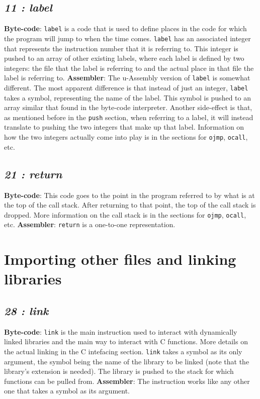 \documentclass[12pt]{report}
\begin{document}
  \subsection{\emph{11 : label}}
  \textbf{Byte-code}: \verb|label| is a code that is used to define places in the code
  for which the program will jump to when the time comes.  \verb|label| has an
  associated integer that represents the instruction number that it is referring to.
  This integer is pushed to an array of other existing labels, where each label is
  defined by two integers: the file that the label is referring to and the actual
  place in that file the label is referring to.\newline
  \textbf{Assembler}: The u-Assembly version of \verb|label| is somewhat different.
  The most apparent difference is that instead of just an integer, \verb|label| takes
  a symbol, representing the name of the label.  This symbol is pushed to an array
  similar that found in the byte-code interpreter.  Another side-effect is that,
  as mentioned before in the \verb|push| section, when referring to a label, it
  will instead translate to pushing the two integers that make up that label.
  \newline
  Information on how the two integers actually come into play is in the sections for
  \verb|ojmp|, \verb|ocall|, etc.
  \subsection{\emph{21 : return}}
  \textbf{Byte-code}: This code goes to the point in the program referred to by what
  is at the top of the call stack.  After returning to that point, the top of
  the call stack is dropped.  More information on the call stack is in the sections for
  \verb|ojmp|, \verb|ocall|, etc.\newline
  \textbf{Assembler}: \verb|return| is a one-to-one representation.

  \section{Importing other files and linking libraries}
  \subsection{\emph{28 : link}}
  \textbf{Byte-code}: \verb|link| is the main instruction used to interact with
  dynamically linked libraries and the main way to interact with C functions.  More
  details on the actual linking in the C intefacing section.  \verb|link| takes a
  symbol as its only argument, the symbol being the name of the library to be linked
  (note that the library's extension is needed).  The library is pushed to the stack
  for which functions can be pulled from.\newline
  \textbf{Assembler}: The instruction works like any other one that takes a symbol as
  its argument.
\end{document}
